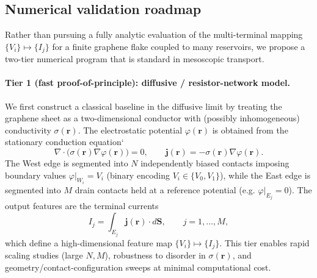 \documentclass[aps, prb, superscriptaddress, longbibliography]{revtex4-2}
\renewcommand{\phi}{\varphi}
\numberwithin{equation}{section}
\begin{document}
    \subsection{Numerical validation roadmap}

    Rather than pursuing a fully analytic evaluation of the multi-terminal mapping
    \(\{V_i\}\mapsto \{I_j\}\) for a finite graphene flake coupled to many reservoirs,
    we propose a two-tier numerical program that is standard in mesoscopic transport.
    
    \paragraph{Tier 1 (fast proof-of-principle): diffusive / resistor-network model.}
    We first construct a classical baseline in the diffusive limit by treating the graphene sheet
    as a two-dimensional conductor with (possibly inhomogeneous) conductivity \(\sigma(\mathbf r)\).
    The electrostatic potential \(\phi(\mathbf r)\) is obtained from the stationary conduction equation`
    \begin{equation}
    \nabla\!\cdot\!\big(\sigma(\mathbf r)\nabla \phi(\mathbf r)\big)=0,
    \qquad
    \mathbf j(\mathbf r)=-\sigma(\mathbf r)\nabla \phi(\mathbf r).
    \end{equation}
    The West edge is segmented into \(N\) independently biased contacts imposing boundary values
    \(\phi|_{W_i}=V_i\) (binary encoding \(V_i\in\{V_0,V_1\}\)), while the East edge is segmented into
    \(M\) drain contacts held at a reference potential (e.g. \(\phi|_{E_j}=0\)).
    The output features are the terminal currents
    \begin{equation}
    I_j = \int_{E_j} \mathbf j(\mathbf r)\cdot d\mathbf S,
    \qquad j=1,\dots,M,
    \end{equation}
    which define a high-dimensional feature map \(\{V_i\}\mapsto \{I_j\}\).
    This tier enables rapid scaling studies (large \(N,M\)), robustness to disorder in \(\sigma(\mathbf r)\),
    and geometry/contact-configuration sweeps at minimal computational cost.
    
\end{document}
